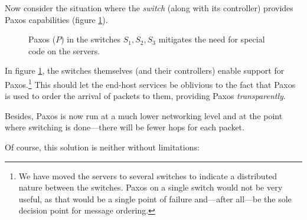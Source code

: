 Now consider the situation where the \textit{switch} (along with its
controller) provides Paxos capabilities (figure
\ref{figure:paxos.on.switches}).

\begin{figure}[H]
  \centering
  \caption{Paxos ($P$) in the switches $S_1, S_2, S_3$ mitigates the need for special code on the servers.}
  \label{figure:paxos.on.switches}
\end{figure}

In figure \ref{figure:paxos.on.switches}, the switches themselves (and their
controllers) enable
support for Paxos.\footnote{We have moved the servers to several switches
to indicate a distributed nature between the switches.
Paxos on a single switch would not be very useful, as that would be a single
point of failure and---after all---be the sole decision point for message
ordering.}
%
This should let the end-host services be oblivious to the fact that Paxos is
used to order the arrival of packets to them, providing Paxos
\textit{transparently}.

Besides, Paxos is now run at a much lower networking level and at the point where switching is done---there will be fewer hops
for each packet.

Of course, this solution is neither without limitations:

